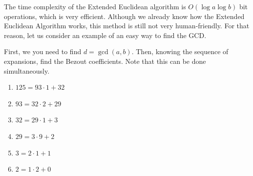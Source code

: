 \documentclass[../lecture-notes.tex]{subfiles}
\begin{document}
The time complexity of the Extended Euclidean algorithm is $O(\log{a} \log{b})$ bit
operations, which is very efficient. Although we already know how the
Extended Euclidean Algorithm works, this method is still not very
human-friendly. For that reason, let us consider an example of an easy way to
find the GCD.

\begin{example} 
    \hfill

    First, we you need to find $d = \gcd(a,b)$. Then, knowing the sequence of
    expansions, find the Bezout coefficients. Note that this can be done
    simultaneously.

    \hfill

    \begin{minipage}{0.4\textwidth}
        \raggedright
        \vspace*{\fill}
            \begin{enumerate}
                \item $125 = 93 \cdot 1 + 32$
                \item $93 = 32 \cdot 2 + 29$
                \item $32 = 29 \cdot 1 + 3$
                \item $29 = 3 \cdot 9 + 2$
                \item $3 = 2 \cdot 1 + 1$
                \item $2 = 1 \cdot 2 + 0$        
            \end{enumerate}
        \vspace*{\fill}
    \end{minipage}
    \begin{minipage}{0.7\textwidth}
\end{minipage}
\end{example}
\end{document}
